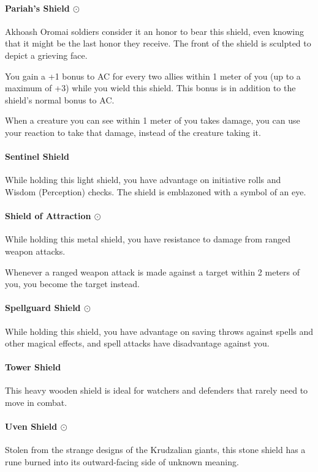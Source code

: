     \paragraph{Pariah's Shield $\odot$}
        Akhoash Oromai soldiers consider it an honor to bear this shield, even knowing that it might be the last honor they receive.
        The front of the shield is sculpted to depict a grieving face.

        You gain a +1 bonus to AC for every two allies within 1 meter of you (up to a maximum of +3) while you wield this shield.
        This bonus is in addition to the shield's normal bonus to AC.

        When a creature you can see within 1 meter of you takes damage, you can use your reaction to take that damage, instead of the creature taking it.
    \paragraph{Sentinel Shield}
        While holding this light shield, you have advantage on initiative rolls and Wisdom (Perception) checks.
        The shield is emblazoned with a symbol of an eye.
    \paragraph{Shield of Attraction $\odot$}
        While holding this metal shield, you have resistance to damage from ranged weapon attacks.

        Whenever a ranged weapon attack is made against a target within 2 meters of you, you become the target instead.
    \paragraph{Spellguard Shield $\odot$}
        While holding this shield, you have advantage on saving throws against spells and other magical effects, and spell attacks have disadvantage against you.
    \paragraph{Tower Shield}
        This heavy wooden shield is ideal for watchers and defenders that rarely need to move in combat.
    \paragraph{Uven Shield $\odot$}
        Stolen from the strange designs of the Krudzalian giants, this stone shield has a rune burned into its outward-facing side of unknown meaning.

